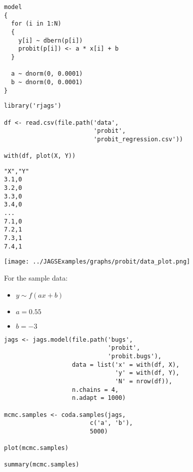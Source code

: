 \documentclass{beamer}
\begin{document}
\begin{frame}[fragile]
  \begin{verbatim}
model
{
  for (i in 1:N)
  {
    y[i] ~ dbern(p[i])
    probit(p[i]) <- a * x[i] + b
  }
  
  a ~ dnorm(0, 0.0001)
  b ~ dnorm(0, 0.0001)
}
  \end{verbatim}
\end{frame}

\begin{frame}[fragile]
  \begin{verbatim}
library('rjags')

df <- read.csv(file.path('data',
                         'probit',
                         'probit_regression.csv'))

with(df, plot(X, Y))
  \end{verbatim}
\end{frame}

\begin{frame}[fragile]
  \begin{verbatim}
"X","Y"
3.1,0
3.2,0
3.3,0
3.4,0
...
7.1,0
7.2,1
7.3,1
7.4,1
  \end{verbatim}
\end{frame}

\begin{frame}[fragile]
  \begin{center}
    \texttt{[image: ../JAGSExamples/graphs/probit/data\_plot.png]}
  \end{center}
\end{frame}

\begin{frame}
  For the sample data:
  \begin{itemize}
    \item{$y \sim f(ax + b)$}
    \item{$a = 0.55$}
    \item{$b = -3$}
  \end{itemize}
\end{frame}

\begin{frame}[fragile]
  \begin{verbatim}
jags <- jags.model(file.path('bugs',
                             'probit',
                             'probit.bugs'),
                   data = list('x' = with(df, X),
                               'y' = with(df, Y),
                               'N' = nrow(df)),
                   n.chains = 4,
                   n.adapt = 1000)
 
mcmc.samples <- coda.samples(jags,
                        c('a', 'b'),
                        5000)

plot(mcmc.samples)

summary(mcmc.samples)
  \end{verbatim}
\end{frame}
\end{document}
